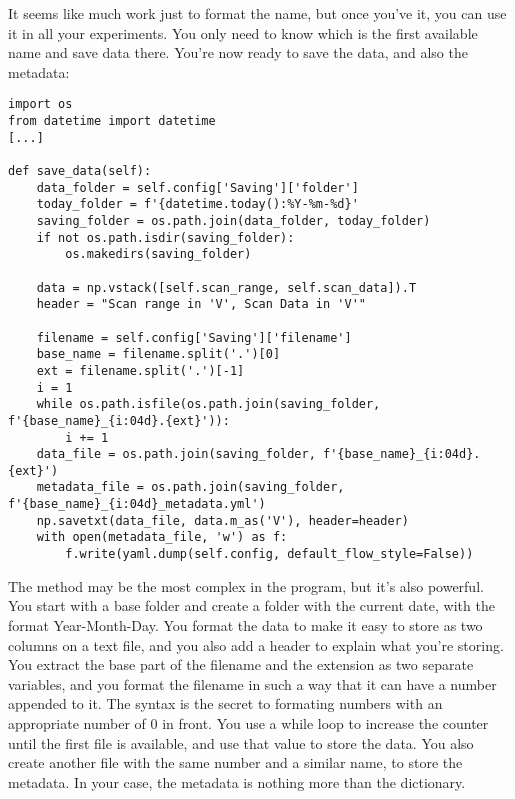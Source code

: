 It seems like much work just to format the name, but once you've it, you can use it in all your experiments. You only need to know which is the first available name and save data there. You're now ready to save the data, and also the metadata:

\begin{verbatim}
import os
from datetime import datetime
[...]

def save_data(self):
    data_folder = self.config['Saving']['folder']
    today_folder = f'{datetime.today():%Y-%m-%d}'
    saving_folder = os.path.join(data_folder, today_folder)
    if not os.path.isdir(saving_folder):
        os.makedirs(saving_folder)

    data = np.vstack([self.scan_range, self.scan_data]).T
    header = "Scan range in 'V', Scan Data in 'V'"

    filename = self.config['Saving']['filename']
    base_name = filename.split('.')[0]
    ext = filename.split('.')[-1]
    i = 1
    while os.path.isfile(os.path.join(saving_folder, f'{base_name}_{i:04d}.{ext}')):
        i += 1
    data_file = os.path.join(saving_folder, f'{base_name}_{i:04d}.{ext}')
    metadata_file = os.path.join(saving_folder, f'{base_name}_{i:04d}_metadata.yml')
    np.savetxt(data_file, data.m_as('V'), header=header)
    with open(metadata_file, 'w') as f:
        f.write(yaml.dump(self.config, default_flow_style=False))
\end{verbatim}

The  method may be the most complex in the program, but it's also powerful. You start with a base folder and create a folder with the current date, with the format Year-Month-Day. You format the data to make it easy to store as two columns on a text file, and you also add a header to explain what you're storing. You extract the base part of the filename and the extension as two separate variables, and you format the filename in such a way that it can have a number appended to it. The syntax  is the secret to formating numbers with an appropriate number of $0$ in front. You use a while loop to increase the counter until the first file is available, and use that value to store the data. You also create another file with the same number and a similar name, to store the metadata. In your case, the metadata is nothing more than the  dictionary.


